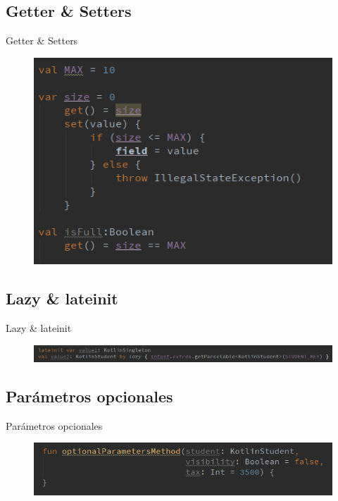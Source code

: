\subsection{Getter \& Setters}
\begin{frame}{Getter \& Setters}{}
    \begin{figure}[h]
    \centering
    \includegraphics[width=\textwidth]{images/kotlin_vs_java/get_set}
    \end{figure}
\end{frame}

\subsection{Lazy \& lateinit}
\begin{frame}{Lazy \& lateinit}{}
    \begin{figure}[h]
    \centering
    \includegraphics[width=\textwidth]{images/kotlin_vs_java/lateinit_lazy}
    \end{figure}
\end{frame}


\subsection{Parámetros opcionales}

\begin{frame}{Parámetros opcionales}{}
    \begin{figure}[h]
    \centering
    \includegraphics[width=\textwidth]{images/kotlin_vs_java/optional_param_1}
    \end{figure}
\end{frame}

